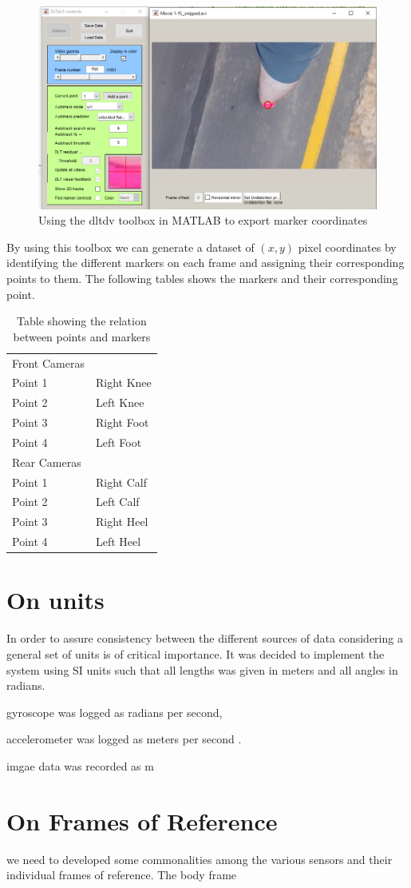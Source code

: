 \begin{figure}[!ht] 
\captionsetup{width=1\linewidth, font=small}  
\includegraphics[width=1\linewidth]{figures/toolbox.png}
\caption{Using the dltdv toolbox in MATLAB to export marker coordinates}
\label{fig:toolbox}
\end{figure}

By using this toolbox we can generate a dataset of $ (x,y) $ pixel coordinates by identifying the different markers on each frame and assigning their corresponding points to them. The following tables shows the markers and their corresponding point.

\begin{table}[!ht]
\centering
\caption{Table showing the relation between points and markers}
\label{my-label}
\begin{tabular}{ll}
Front Cameras &            \\
Point 1       & Right Knee \\
Point 2       & Left Knee  \\
Point 3       & Right Foot \\
Point 4       & Left Foot  \\
Rear Cameras  &            \\
Point 1       & Right Calf \\
Point 2       & Left Calf  \\
Point 3       & Right Heel \\
Point 4       & Left Heel 
\end{tabular}
\end{table} 


\section{On units}
In order to assure consistency between the different sources of data considering a general set of units is of critical importance. It was decided to implement the system using SI units such that all lengths was given in meters and all angles in radians.

gyroscope was logged as radians per second,

accelerometer was logged as meters per second .

imgae data was recorded as m

\section{On Frames of Reference}
we need to developed some commonalities among the various sensors and their individual frames of reference. The body frame






